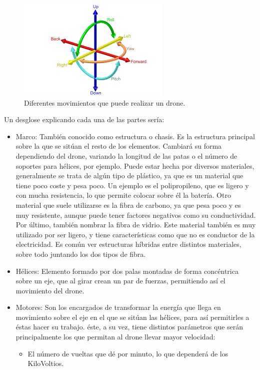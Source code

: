 \begin{figure}[H]
  \centering
  \includegraphics[scale=0.8]{imagenes/pitchRolYaw.png}
  \caption{Diferentes movimientos que puede realizar un drone.}
  \label{fig:gnat}
\end{figure}

Un desglose explicando cada una de las partes sería:
\begin{itemize}
\item Marco: También conocido como estructura o chasis. Es la estructura
principal sobre la que se sitúan el resto de los elementos. Cambiará su forma
dependiendo del drone, variando la longitud de las patas o el número de soportes
para hélices, por ejemplo. Puede estar hecha por diversos materiales, generalmente se
trata de algún tipo de plástico, ya que es un material que tiene poco coste y pesa poco.
Un ejemplo es el polipropileno, que es ligero y con mucha resistencia, lo que permite
colocar sobre él la batería. Otro material que suele utilizarse es la fibra de carbono,
ya que pesa poco y es muy resistente, aunque puede tener factores negativos como su
conductividad. Por último, también nombrar la fibra de vidrio. Este material también
es muy utilizado por ser ligero, y tiene características como que no es conductor de la
electricidad. Es común ver estructuras híbridas entre distintos materiales, sobre todo
juntando los dos tipos de fibra.
\item Hélices: Elemento formado por dos palas montadas de forma concéntrica
sobre un eje, que al girar crean un par de fuerzas, permitiendo así el movimiento del
drone.
\item Motores: Son los encargados de transformar la energía que llega en
movimiento sobre el eje en el que se sitúan las hélices, para así permitirles a éstas
hacer su trabajo. éste, a su vez, tiene distintos parámetros que serán principalmente
los que permitan al drone llevar mayor velocidad:
	\begin{itemize}
	\item El número de vueltas que dé por minuto, lo que dependerá de los KiloVoltios.

\end{itemize}
\end{itemize}

